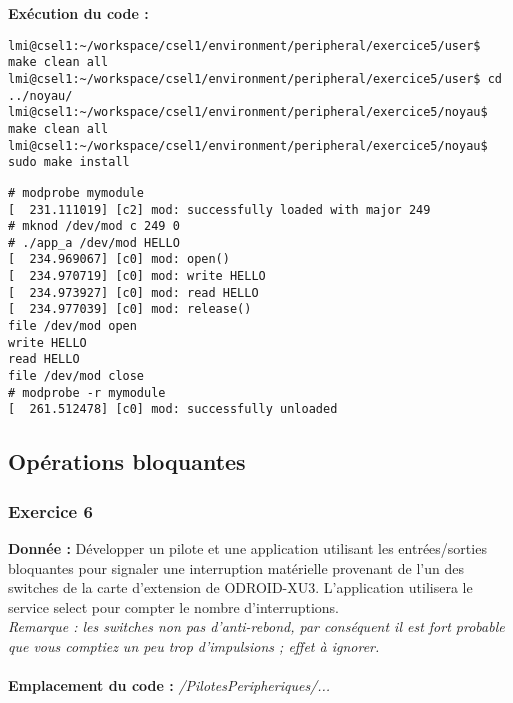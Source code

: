 \textbf{Exécution du code : } \\
\begin{lstlisting}
lmi@csel1:~/workspace/csel1/environment/peripheral/exercice5/user$ make clean all
lmi@csel1:~/workspace/csel1/environment/peripheral/exercice5/user$ cd ../noyau/
lmi@csel1:~/workspace/csel1/environment/peripheral/exercice5/noyau$ make clean all
lmi@csel1:~/workspace/csel1/environment/peripheral/exercice5/noyau$ sudo make install
\end{lstlisting}
\begin{lstlisting}
# modprobe mymodule                                                             
[  231.111019] [c2] mod: successfully loaded with major 249    
# mknod /dev/mod c 249 0                  
# ./app_a /dev/mod HELLO                                                        
[  234.969067] [c0] mod: open()                                                 
[  234.970719] [c0] mod: write HELLO                                            
[  234.973927] [c0] mod: read HELLO                                             
[  234.977039] [c0] mod: release()                                              
file /dev/mod open                                                              
write HELLO                                                                     
read HELLO                                                                      
file /dev/mod close                                                             
# modprobe -r mymodule                                                          
[  261.512478] [c0] mod: successfully unloaded
\end{lstlisting}

\subsection{Opérations bloquantes}
\subsubsection{Exercice 6}
\textbf{Donnée : } Développer	un pilote	et	une	application	utilisant	les	entrées/sorties	bloquantes	pour	signaler	une	
interruption	matérielle provenant	de	l’un	des	switches	de	la	carte	d’extension	de	ODROID-XU3.
L’application	utilisera	le	service	select	pour	compter	le	nombre	d’interruptions.\\
\textit{Remarque :	les	switches	non	pas	d’anti-rebond,	par	conséquent il	est	fort	probable	que	vous	
comptiez	un	peu	trop	d’impulsions ;	effet	à	ignorer.	}
\\\\
\textbf{Emplacement du code : } \textit{/PilotesPeripheriques/...}\\

